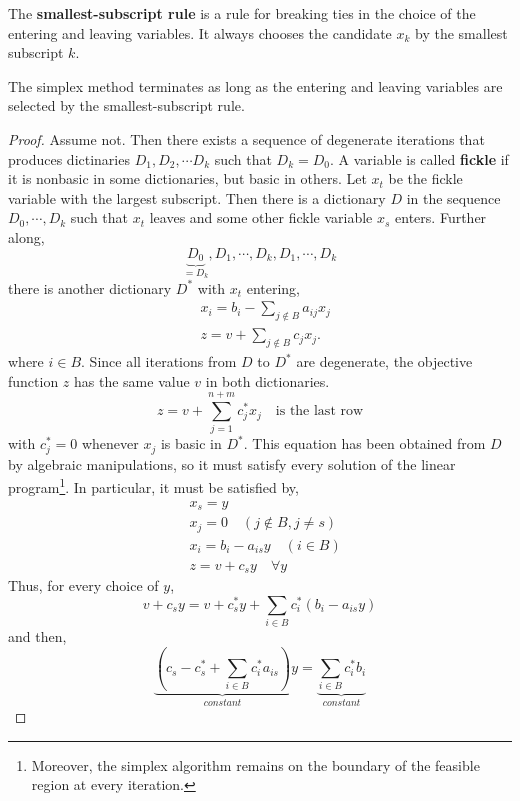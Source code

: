 	\begin{defn}
		The \textbf{smallest-subscript rule} is a rule for breaking ties in the choice of the entering and leaving variables. It always chooses the candidate $x_k$ by the smallest subscript $k$. 
	\end{defn}

	\begin{thm}
		The simplex method terminates as long as the entering and leaving variables are selected by the smallest-subscript rule.
	\end{thm}

	\begin{proof}
		Assume not. Then there exists a sequence of degenerate iterations that produces dictinaries $D_1, D_2, \cdots D_k$ such that $D_k = D_0$. A variable is called \textbf{fickle} if it is nonbasic in some dictionaries, but basic in others. Let $x_t$ be the fickle variable with the largest subscript. Then there is a dictionary $D$ in the sequence $D_0, \cdots, D_k$ such that $x_t$ leaves and some other fickle variable $x_s$ enters. Further along,
		\[\underbrace{D_0}_{=D_k}, D_1, \cdots, D_k, D_1, \cdots, D_k\]
		\noindent there is another dictionary $D^*$ with $x_t$ entering,
		\[\begin{aligned}
		&x_{i}=b_{i}-\sum_{j \notin B} a_{i j} x_{j}\\
		&z=v+\sum_{j \notin B} c_{j} x_{j} \text {. }
		\end{aligned}\]
		\noindent where $i \in B$. Since all iterations from $D$ to $D^*$ are degenerate, the objective function $z$ has the same value $v$ in both dictionaries.
		\[z=v+\sum_{j=1}^{n+m} c_{j}^{*} x_{j} \quad \text{is the last row}\]
		\noindent with $c_j^* = 0$ whenever $x_j$ is basic in $D^*$. This equation has been obtained from $D$ by algebraic manipulations, so it must satisfy every solution of the linear program\footnote{Moreover, the simplex algorithm remains on the boundary of the feasible region at every iteration.}. In particular, it must be satisfied by,
		\begin{align*}
			&x_s = y \\
			&x_j = 0 \quad (j \not\in B, j \neq s) \\
			&x_i = b_i - a_{is}y \quad (i \in B) \\
			&z = v + c_sy \quad \forall y
		\end{align*}
		Thus, for every choice of $y$,
		\[v+c_{s} y=v+c_{s}^{*} y+\sum_{i \in B} c_{i}^{*}\left(b_{i}-a_{i s} y\right)\]
		and then,
		\[\underbrace{\left(c_{s}-c_{s}^{*}+\sum_{i \in B} c_{i}^{*} a_{i s}\right)}_{constant} y= \underbrace{\sum_{i \in B} c_{i}^{*} b_{i}}_{constant}\]

\end{proof}

